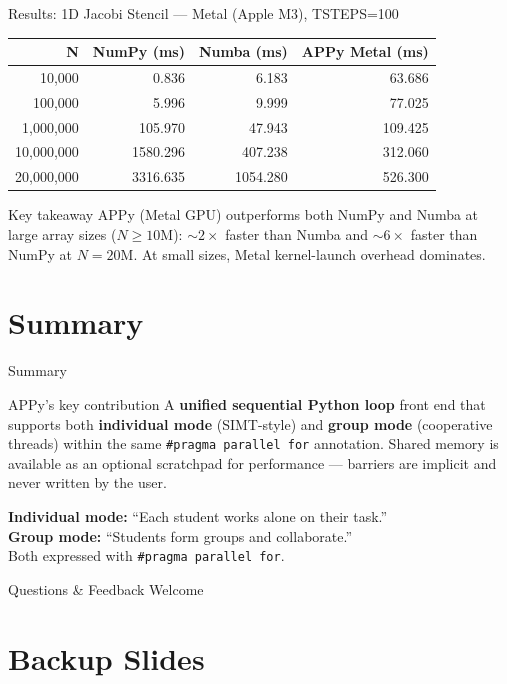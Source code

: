 \documentclass[aspectratio=169]{beamer}
\begin{document}
\begin{frame}{Results: 1D Jacobi Stencil — Metal (Apple M3), TSTEPS=100}
  \centering
  \footnotesize
  \begin{tabular}{rrrr}
    \toprule
    \textbf{N} & \textbf{NumPy (ms)} & \textbf{Numba (ms)} & \textbf{APPy Metal (ms)} \\
    \midrule
    10{,}000    &    0.836 &    6.183 &   63.686 \\
    100{,}000   &    5.996 &    9.999 &   77.025 \\
    1{,}000{,}000  &  105.970 &   47.943 &  109.425 \\
    10{,}000{,}000 & 1580.296 &  407.238 &  312.060 \\
    20{,}000{,}000 & 3316.635 & 1054.280 &  526.300 \\
    \bottomrule
  \end{tabular}

  \vspace{0.8em}
  \begin{alertblock}{Key takeaway}
    APPy (Metal GPU) outperforms both NumPy and Numba at large array sizes
    ($N \geq 10\text{M}$): ${\sim}2\times$ faster than Numba and ${\sim}6\times$
    faster than NumPy at $N=20\text{M}$.
    At small sizes, Metal kernel-launch overhead dominates.
  \end{alertblock}
\end{frame}

\section{Summary}

\begin{frame}[fragile]{Summary}
  \begin{block}{APPy's key contribution}
    A \textbf{unified sequential Python loop} front end that supports both
    \textbf{individual mode} (SIMT-style) and \textbf{group mode} (cooperative threads)
    within the same \texttt{\#pragma parallel for} annotation.
    Shared memory is available as an optional scratchpad for performance —
    barriers are implicit and never written by the user.
  \end{block}

  \vspace{1em}
  \textbf{Individual mode:} ``Each student works alone on their task.''\\
  \textbf{Group mode:} ``Students form groups and collaborate.''\\[0.5em]
  Both expressed with \texttt{#pragma parallel for}.

  \vspace{1em}
  \begin{center}
    \large Questions \& Feedback Welcome
  \end{center}
\end{frame}

\appendix
\section{Backup Slides}
\end{document}
